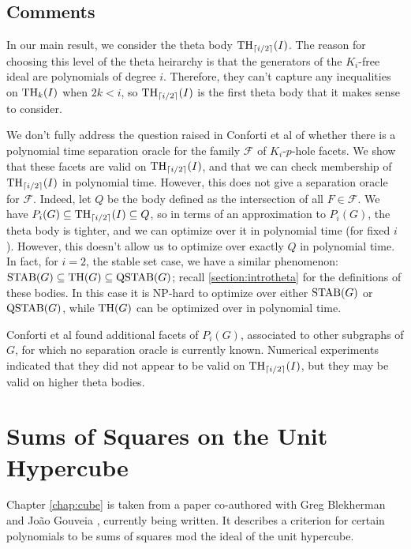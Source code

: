 \subsection{Comments}
In our main result, we consider the theta body $\textup{TH}_{\lceil i/2 \rceil}(I)$. 
The reason for choosing this level of the theta heirarchy is that the generators of the $K_i$-free ideal are polynomials of degree $i$.
Therefore, they can't capture any inequalities on $\textup{TH}_k(I)$ when $2k < i$, so $\textup{TH}_{\lceil i/2 \rceil}(I)$ is the first theta body that it makes sense to consider.

We don't fully address the question raised in Conforti et al \cite{conforti} of whether there is a polynomial time separation oracle for the family $\mathcal{F}$ of $K_i$-$p$-hole facets.
We show that these facets are valid on $\textup{TH}_{\lceil i/2\rceil}(I)$, and that we can check membership of $\textup{TH}_{\lceil i/2 \rceil}(I)$ in polynomial time. 
However, this does not give a separation oracle for $\mathcal{F}$.
Indeed, let $Q$ be the body defined as the intersection of all $F \in \mathcal{F}$.
We have $P_i(G) \subseteq \textup{TH}_{\lceil i/2\rceil}(I) \subseteq Q$, so in terms of an approximation to $P_i(G)$, the theta body is tighter, and we can optimize over it in polynomial time (for fixed $i$).
However, this doesn't allow us to optimize over exactly $Q$ in polynomial time.
In fact, for $i=2$, the stable set case, we have a similar phenomenon: $\textup{STAB}(G) \subseteq \textup{TH}(G) \subseteq \textup{QSTAB}(G)$; recall \ref{section:introtheta} for the definitions of these bodies.
In this case it is NP-hard to optimize over either $\textup{STAB}(G)$ or $\textup{QSTAB}(G)$, while $\textup{TH}(G)$ can be optimized over in polynomial time.


Conforti et al \cite{conforti} found additional facets of $P_i(G)$, associated to other subgraphs of $G$, for which no separation oracle is currently known. 
Numerical experiments indicated that they did not appear to be valid on $\textup{TH}_{\lceil i/2\rceil}(I)$, but they may be valid on higher theta bodies.

\section{Sums of Squares on the Unit Hypercube}
Chapter \ref{chap:cube} is taken from a paper co-authored with Greg Blekherman and Jo\~ao Gouveia \cite{cubepaper}, currently being written. %
It describes a criterion for certain polynomials to be sums of squares mod the ideal of the unit hypercube.

